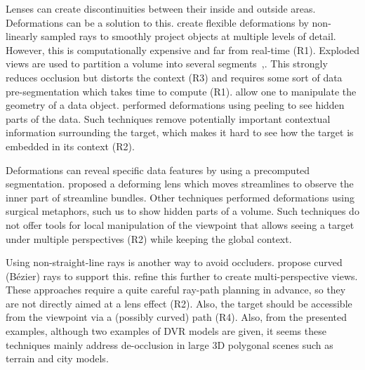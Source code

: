 Lenses can create discontinuities between their inside and outside areas. Deformations can be a solution to this.
 \cite{Hsu:2011:RFM:2070781.2024165} create flexible deformations by non-linearly sampled rays to smoothly project objects at multiple levels of detail. However, this is computationally expensive and far from real-time (R1). Exploded views are used to partition a volume into several segments\, \cite{Sonnet:2004:IEA:989863.989871},\cite{4015467}. This strongly reduces occlusion but distorts the context (R3) and requires some sort of data pre-segmentation which takes time to compute (R1). \cite{Correa:2007:IDD:1313046.1313163,Correa:2006:FAV:1187627.1187827} allow one to manipulate the geometry of a data object.\cite{1250400} performed deformations using peeling to see hidden parts of the data. Such techniques remove potentially important contextual information surrounding the target, which makes it hard to see how the target is embedded in its context (R2).

Deformations can reveal specific data features by using a precomputed segmentation. \cite{7332955} proposed a deforming lens which moves streamlines to observe the inner part of streamline bundles. Other techniques performed deformations using surgical metaphors, such us \cite{4069230,Correa:2006:FAV:1187627.1187827} to show hidden parts of a volume. Such techniques do not offer tools for local manipulation of the viewpoint that allows seeing a target under multiple perspectives (R2) while keeping the global context. 

Using non-straight-line rays is another way to avoid occluders. \cite{5613463} propose curved (B{\'e}zier) rays to support this.  \cite{7120994} refine this further to create multi-perspective views. These approaches require a quite careful ray-path planning in advance, so they are not directly aimed at a lens effect (R2). Also, the target should be accessible from the viewpoint via a (possibly curved) path (R4). Also, from the presented examples, although two examples of DVR models are given, it seems these techniques mainly address de-occlusion in large 3D polygonal scenes such as terrain and city models.

